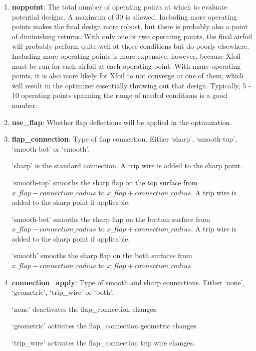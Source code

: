 \documentclass[11pt]{article}
\begin{document}
\begin{enumerate}
\item{\textbf{noppoint}: The total number of operating points at which to evaluate
	potential designs.  A maximum of 30 is allowed.  Including more operating points makes the
	final design more robust, but there is probably also a point of diminishing returns.
	With only one or two operating points, the final airfoil will
	probably perform quite well at those conditions but do poorly elsewhere.  Including more
	operating points is more expensive, however, because Xfoil must be run for each airfoil at
	each operating point. With many operating points, it is also more likely for Xfoil to not
	converge at one of
	them, which will result in the optimizer essentially throwing out that design.
	Typically, 5 - 10 operating points spanning the range of needed conditions is a
	good number.}
\item{\textbf{use\_flap}: Whether flap deflections will be applied in the optimization.}
\item{\textbf{flap\_connection}: Type of flap connection. Either `sharp', `smooth-top', `smooth-bot' or `smooth'.
	
	`sharp' is the standard connection. A trip wire is added to the sharp point.
	
	`smooth-top' smooths the sharp flap on the top surface from $x\_flap-connection\_radius$ to $x\_flap+connection\_radius$. 
	A trip wire is added to the sharp point if applicable.
	
	`smooth-bot' smooths the sharp flap on the bottom surface from $x\_flap-connection\_radius$ to $x\_flap+connection\_radius$.
	A trip wire is added to the sharp point if applicable.
	
	`smooth' smooths the sharp flap on the both surfaces from $x\_flap-connection\_radius$ to $x\_flap+connection\_radius$.}
\item{\textbf{connection\_apply}: Type of smooth and sharp connections. Either `none', `geometric', `trip\_wire' or `both'.
	
	`none' deactivates the flap\_connection changes.
	
	`geometric' activates the flap\_connection geometric changes.
	
	`trip\_wire' activates the flap\_connection trip wire changes.
	
}
\end{enumerate}
\end{document}
